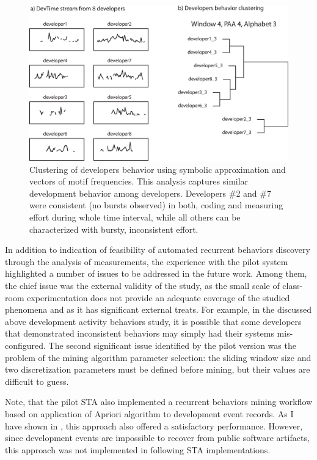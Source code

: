 \begin{figure}[t]
   \centering
   \includegraphics[width=145mm]{figures/STA1.eps}
   \caption{Clustering of developers behavior using symbolic approximation and vectors of motif frequencies. 
   This analysis captures similar development behavior among developers. 
   Developers \#2 and \#7 were consistent (no bursts observed) in both, coding and measuring effort during whole time interval, 
   while all others can be characterized with bursty, inconsistent effort.}
   \label{fig:STA1-results}
\end{figure}

In addition to indication of feasibility of automated recurrent behaviors discovery through the analysis of measurements, 
the experience with the pilot system highlighted a number of issues to be addressed in the future work. 
Among them, the chief issue was the external validity of the study, as the small scale of class-room 
experimentation does not provide an adequate coverage of the studied phenomena and as it has significant external 
treats. For example, in the discussed above development activity behaviors study, it is possible that some developers 
that demonstrated inconsistent behaviors may simply had their systems mis-configured.
The second significant issue identified by the pilot version was the problem of the mining algorithm parameter selection:
the sliding window size and two discretization parameters must be defined before mining, but their values are difficult 
to guess.

Note, that the pilot STA also implemented a recurrent behaviors mining workflow based on application of Apriori algorithm 
\cite{citeulike:775528} to development event records. As I have shown in \cite{citeulike:13159603}, this approach also
offered a satisfactory performance. However, since development events are impossible to recover from public software 
artifacts, this approach was not implemented in following STA implementations.

